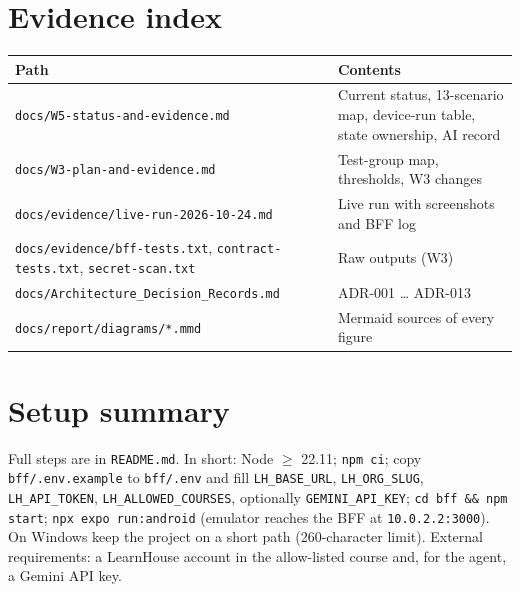 \documentclass[11pt,a4paper]{article}
\newcommand{\fp}[1]{\nolinkurl{#1}}
\begin{document}
\section{Evidence index}
\begin{xltabular}{\textwidth}{L{0.42\textwidth}Y}
\toprule
\textbf{Path} & \textbf{Contents} \\
\midrule
\fp{docs/W5-status-and-evidence.md} & Current status, 13-scenario map, device-run table, state ownership, AI record \\
\fp{docs/W3-plan-and-evidence.md} & Test-group map, thresholds, W3 changes \\
\fp{docs/evidence/live-run-2026-10-24.md} & Live run with screenshots and BFF log \\
\fp{docs/evidence/bff-tests.txt}, \fp{contract-tests.txt}, \fp{secret-scan.txt} & Raw outputs (W3) \\
\fp{docs/Architecture_Decision_Records.md} & ADR-001 … ADR-013 \\
\fp{docs/report/diagrams/*.mmd} & Mermaid sources of every figure \\
\bottomrule
\end{xltabular}

\section{Setup summary}
Full steps are in \fp{README.md}. In short: Node $\ge$ 22.11; \texttt{npm ci}; copy
\fp{bff/.env.example} to \fp{bff/.env} and fill \texttt{LH\_BASE\_URL}, \texttt{LH\_ORG\_SLUG},
\texttt{LH\_API\_TOKEN}, \texttt{LH\_ALLOWED\_COURSES}, optionally \texttt{GEMINI\_API\_KEY};
\texttt{cd bff \&\& npm start}; \texttt{npx expo run:android} (emulator reaches the BFF at
\texttt{10.0.2.2:3000}). On Windows keep the project on a short path (260-character limit). External
requirements: a LearnHouse account in the allow-listed course and, for the agent, a Gemini API key.
\end{document}
